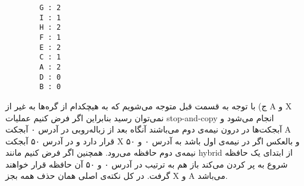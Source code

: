 \begin{latin}
	\begin{verbatim}
		G : 2
		I : 1
		H : 2
		F : 1
		E : 2
		C : 1
		A : 2
		D : 0
		B : 0
	\end{verbatim}
\end{latin}
ج) با توجه به قسمت قبل متوجه می‌شویم که به هیچکدام از گره‌ها به غیر از A و X نمی‌توان رسید بنابراین اگر فرض کنیم عملیات stop-and-copy انجام می‌شود و آبجکت‌ها در درون نیمه‌ی دوم می‌باشند آنگاه بعد از زباله‌روبی در آدرس ۰ آبجکت A قرار دارد و در آدرس ۵۰ آبجکت X و بالعکس اگر در نیمه‌ی اول باشد به آدرس ۰ و ۵۰ نیمه‌ی دوم حافظه می‌رود. همچنین اگر فرض کنیم مانند hybrid از ابتدای یک حافظه شروع به پر کردن می‌کند باز هم به ترتیب در آدرس ۰ و ۵۰ آن حافظه قرار خواهند گرفت. در کل نکته‌ی اصلی همان حذف همه بجز X و A می‌باشد.	

